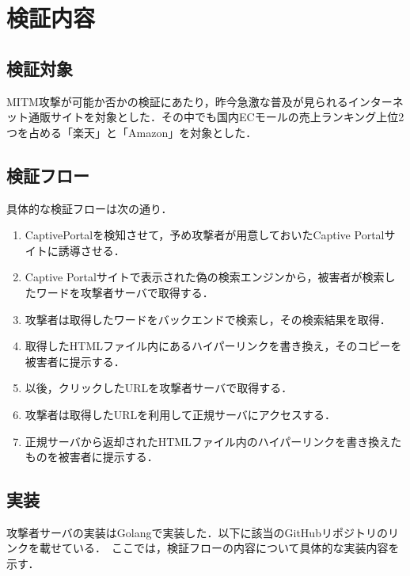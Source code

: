 \documentclass[dvipdfmx]{jsarticle}
\begin{document}
    \section{検証内容}
        \subsection{検証対象}
            MITM攻撃が可能か否かの検証にあたり，昨今急激な普及が見られるインターネット通販サイトを対象とした．その中でも国内ECモールの売上ランキング上位2つを占める「楽天」と「Amazon」を対象とした．
        \subsection{検証フロー}
            具体的な検証フローは次の通り．
            \begin{enumerate}
                \item CaptivePortalを検知させて，予め攻撃者が用意しておいたCaptive Portalサイトに誘導させる．
                \item Captive Portalサイトで表示された偽の検索エンジンから，被害者が検索したワードを攻撃者サーバで取得する．
                \item 攻撃者は取得したワードをバックエンドで検索し，その検索結果を取得．
                \item 取得したHTMLファイル内にあるハイパーリンクを書き換え，そのコピーを被害者に提示する．
                \item 以後，クリックしたURLを攻撃者サーバで取得する．
                \item 攻撃者は取得したURLを利用して正規サーバにアクセスする．
                \item 正規サーバから返却されたHTMLファイル内のハイパーリンクを書き換えたものを被害者に提示する．
            \end{enumerate}
        \subsection{実装}
            攻撃者サーバの実装はGolangで実装した．以下に該当のGitHubリポジトリのリンクを載せている．\
            ここでは，検証フローの内容について具体的な実装内容を示す．
\end{document}
